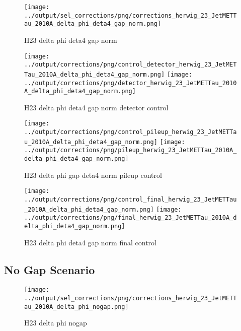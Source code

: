 \documentclass[11pt]{book}
\begin{document}
\begin{figure}[ht]
\centering
\texttt{[image: ../output/sel\_corrections/png/corrections\_herwig\_23\_JetMETTau\_2010A\_delta\_phi\_deta4\_gap\_norm.png]}
\caption{H23 delta phi deta4 gap norm}
\label{fig:H23_JetMETTau_2010A_delta_phi_deta4_gap_norm}
\end{figure}


\begin{figure}[ht]
\centering
\texttt{[image: ../output/corrections/png/control\_detector\_herwig\_23\_JetMETTau\_2010A\_delta\_phi\_deta4\_gap\_norm.png]}
\texttt{[image: ../output/corrections/png/detector\_herwig\_23\_JetMETTau\_2010A\_delta\_phi\_deta4\_gap\_norm.png]}
\caption{H23 delta phi deta4 gap norm detector control}
\label{fig:H23_JetMETTau_2010A_delta_phi_deta4_gap_norm_detector_control}
\end{figure}

\begin{figure}[ht]
\centering
\texttt{[image: ../output/corrections/png/control\_pileup\_herwig\_23\_JetMETTau\_2010A\_delta\_phi\_deta4\_gap\_norm.png]}
\texttt{[image: ../output/corrections/png/pileup\_herwig\_23\_JetMETTau\_2010A\_delta\_phi\_deta4\_gap\_norm.png]}
\caption{H23 delta phi gap deta4 norm pileup control}
\label{fig:H23_JetMETTau_2010A_delta_phi_deta4_gap_norm_pileup_control}
\end{figure}


\begin{figure}[ht]
\centering
\texttt{[image: ../output/corrections/png/control\_final\_herwig\_23\_JetMETTau\_2010A\_delta\_phi\_deta4\_gap\_norm.png]}
\texttt{[image: ../output/corrections/png/final\_herwig\_23\_JetMETTau\_2010A\_delta\_phi\_deta4\_gap\_norm.png]}
\caption{H23 delta phi deta4 gap norm final control}
\label{fig:H23_JetMETTau_2010A_delta_phi_deta4_gap_norm_final_control}
\end{figure}

\clearpage
\subsection{No Gap Scenario}
\begin{figure}[ht]
\centering
\texttt{[image: ../output/sel\_corrections/png/corrections\_herwig\_23\_JetMETTau\_2010A\_delta\_phi\_nogap.png]}
\caption{H23 delta phi nogap}
\label{fig:H23_JetMETTau_2010A_delta_phi_nogap}
\end{figure}
\end{document}
